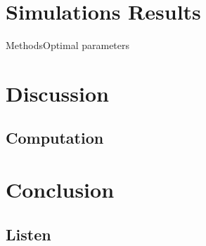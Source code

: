\section{Simulations Results}

\begin{frame}{Methods}{Optimal parameters}		

\end{frame}




\section{Discussion}

\subsection{Computation}

\section{Conclusion}

\subsection{Listen}
